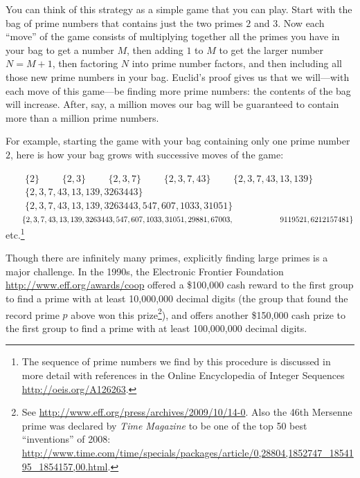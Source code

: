 \documentclass[openany]{book}
\theoremstyle{plain}
\theoremstyle{definition}
\begin{document}
You can think of this strategy as a simple game that you can
play. Start with the bag of prime numbers
that contains just the two primes $2$ and $3$. Now each ``move'' of the game
consists of multiplying together all the primes you have in your bag
to get a number $M$, then adding $1$ to $M$ to get the larger
number $N=M+1$, then factoring $N$ into prime number factors, and then
including all those new prime numbers in your bag. Euclid's proof
gives us that we will---with each move of this game---be finding more
prime numbers: the contents of the bag will increase. After, say,
a million moves our bag will be guaranteed to contain more than
a million prime numbers.

For example, starting the game with your bag containing
only one prime number $2$, here is how your bag grows with
successive moves of the game:

$\mbox{}\qquad\{2\}$
\newline
$\mbox{}\qquad\{2,3\}$
\newline
$\mbox{}\qquad\{2,3, 7\}$
\newline
$\mbox{}\qquad\{2,3, 7, 43\}$
\newline
$\mbox{}\qquad\{2,3, 7, 43, 13, 139\}$
\newline
$\mbox{}\qquad\{2,3, 7, 43, 13, 139, 3263443\}$
\newline
$\mbox{}\qquad\{2,3, 7, 43, 13, 139, 3263443,  547, 607, 1033, 31051\}$
\newline
$\mbox{}\qquad\{2,3, 7, 43, 13, 139, 3263443,  547, 607, 1033, 31051, 29881, 67003,\\
\mbox{}\qquad\qquad\qquad 9119521, 6212157481\}$
\newline
\mbox{}\qquad{}etc.\footnote{The sequence of prime numbers we find by this
procedure is discussed in more detail with references
in the Online Encyclopedia of Integer Sequences \url{http://oeis.org/A126263}.}

Though there are infinitely many primes, explicitly finding large primes is a
major challenge.  In the 1990s, the Electronic Frontier Foundation
\url{http://www.eff.org/awards/coop} offered a \$100{,}000 cash reward
to the first group to find a prime with at least 10{,}000{,}000 decimal
digits (the group that found the record prime $p$ above won this prize\footnote{%
See \url{http://www.eff.org/press/archives/2009/10/14-0}.
Also the 46th Mersenne prime was declared by {\em Time Magazine} to be
one of the top 50 best ``inventions'' of 2008: \url{http://www.time.com/time/specials/packages/article/0,28804,1852747_1854195_1854157,00.html}.}), and offers
another \$150{,}000 cash prize to the first group to find a prime with
at least 100{,}000{,}000 decimal digits.
\end{document}
